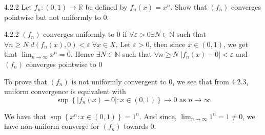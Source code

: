 \documentclass[a4paper,norsk]{article}
\renewcommand{\geq}{\geqslant}
\renewcommand{\epsilon}{\varepsilon}
\begin{document}
\begin{oppgavebox}{4.2.2}{}
Let $ f_n : \left( 0, 1 \right) \to \mathbb{R} $ be defined by $ f_n(x) = x^n $. Show that $ \left( f_n \right)  $ converges pointwise but not uniformly to 0.

\begin{proofbox}{4.2.2}{}
  $ \left( f_n \right)  $ converges uniformly to 0 if $ \forall \epsilon > 0 \exists N \in \mathbb{N} $ such that $ \forall n \geq N \; d \left( f_n(x), 0 \right) < \epsilon \; \forall x \in X$. Let $ \epsilon > 0 $, then since $ x \in \left( 0, 1 \right)  $, we get that $ \lim_{n \to \infty} x^n = 0 $. Hence $ \exists N \in  \mathbb{N} $ such that $ \forall n \geq N \; \left| f_n(x) - 0 \right| < \epsilon  $ and $ \left( f_n \right)  $  converges pointwise to 0


  To prove that $ \left( f_n \right)  $ is not uniformly convergent to 0, we see that from 4.2.3, uniform convergence is equivalent with 
  \[
      \sup \left\{ \left| f_n(x) - 0 \right| : x \in \left( 0, 1 \right)  \right\} \to 0 \text{ as } n \to \infty
  \]

  We have that $ \sup \left\{ x^n : x \in \left( 0, 1 \right)  \right\} = 1^n $. And since, $ \lim_{n \to \infty} 1^n = 1 \neq 0 $, we have non-uniform converge for $ \left( f_n \right)  $ towards 0.
  
\end{proofbox}
\end{oppgavebox}
\end{document}
